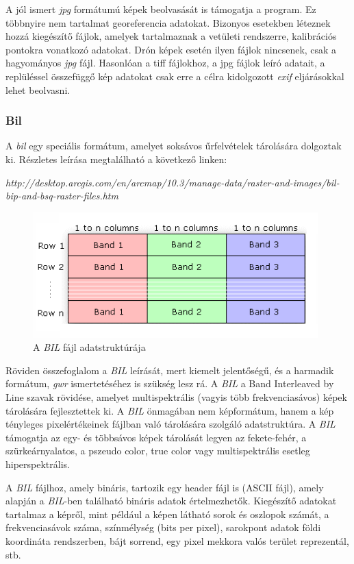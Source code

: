 \documentclass[a4paper,12pt]{article}
\begin{document}
A jól ismert \textit{jpg} formátumú képek beolvasását is támogatja a program. Ez többnyire nem tartalmat georeferencia adatokat. Bizonyos esetekben léteznek hozzá kiegészítő fájlok, amelyek tartalmaznak a vetületi rendszerre, kalibrációs pontokra vonatkozó adatokat. Drón képek esetén ilyen fájlok nincsenek, csak a hagyományos \textit{jpg} fájl. Hasonlóan a tiff fájlokhoz, a jpg fájlok leíró adatait, a replüléssel összefüggő kép adatokat csak erre a célra kidolgozott \textit{exif} eljárásokkal lehet beolvasni.

\subsubsection{Bil}
A \textit{bil} egy speciális formátum, amelyet soksávos űrfelvételek tárolására dolgoztak ki. Részletes leírása megtalálható a következő linken:

\noindent
\textit{http://desktop.arcgis.com/en/arcmap/10.3/manage-data/raster-and-images/bil-bip-and-bsq-raster-files.htm}

\begin{figure}
	\centering
	\includegraphics[width=11cm]{bil_struc1.png}
	\caption{A \textit{BIL} fájl adatstruktúrája}
	\label{fig:bilstruc1}
\end{figure}

Röviden összefoglalom a \textit{BIL} leírását, mert kiemelt jelentőségű, és a harmadik formátum, \textit{gwr} ismertetéséhez is szükség lesz rá. A \textit{BIL} a Band Interleaved by Line szavak rövidése, amelyet multispektrális (vagyis több frekvenciasávos) képek tárolására fejlesztettek ki. A \textit{BIL} önmagában nem képformátum, hanem a kép tényleges pixelértékeinek fájlban való tárolására szolgáló adatstruktúra. A \textit{BIL} támogatja az egy- és többsávos képek tárolását legyen az fekete-fehér, a szürkeárnyalatos, a pszeudo color, true color vagy multispektrális esetleg hiperspektrális.



A \textit{BIL} fájlhoz, amely bináris, tartozik egy header fájl is (ASCII fájl), amely alapján a \textit{BIL}-ben található bináris adatok értelmezhetők. Kiegészítő adatokat tartalmaz a képről, mint például a képen látható sorok és oszlopok számát, a frekvenciasávok száma, színmélység (bits per pixel), sarokpont adatok földi koordináta rendszerben, bájt sorrend, egy pixel mekkora valós terület reprezentál, stb.
\end{document}
